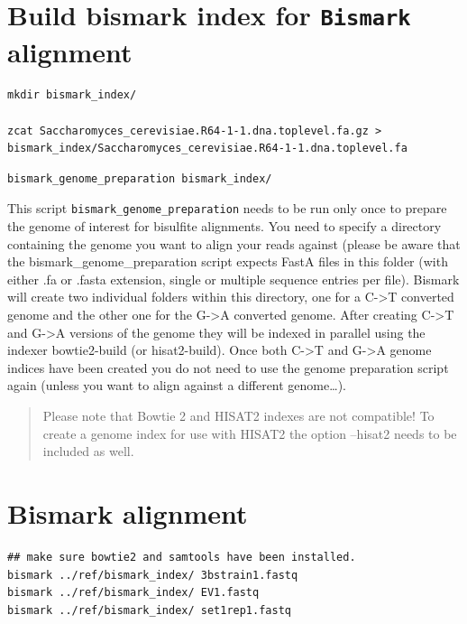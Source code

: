 \documentclass[]{book}
\begin{document}
\hypertarget{build-bismark-index-for-bismark-alignment}{%
\section{\texorpdfstring{Build bismark index for \texttt{Bismark} alignment}{Build bismark index for Bismark alignment}}\label{build-bismark-index-for-bismark-alignment}}

\begin{verbatim}
mkdir bismark_index/

zcat Saccharomyces_cerevisiae.R64-1-1.dna.toplevel.fa.gz > bismark_index/Saccharomyces_cerevisiae.R64-1-1.dna.toplevel.fa
\end{verbatim}

\begin{verbatim}
bismark_genome_preparation bismark_index/
\end{verbatim}

This script \texttt{bismark\_genome\_preparation} needs to be run only once to prepare the genome of interest for bisulfite alignments. You need to specify a directory containing the genome you want to align your reads against (please be aware that the bismark\_genome\_preparation script expects FastA files in this folder (with either .fa or .fasta extension, single or multiple sequence entries per file). Bismark will create two individual folders within this directory, one for a C-\textgreater{}T converted genome and the other one for the G-\textgreater{}A converted genome. After creating C-\textgreater{}T and G-\textgreater{}A versions of the genome they will be indexed in parallel using the indexer bowtie2-build (or hisat2-build). Once both C-\textgreater{}T and G-\textgreater{}A genome indices have been created you do not need to use the genome preparation script again (unless you want to align against a different genome\ldots{}).

\begin{quote}
Please note that Bowtie 2 and HISAT2 indexes are not compatible! To create a genome index for use with HISAT2 the option --hisat2 needs to be included as well.
\end{quote}

\hypertarget{bismark-alignment}{%
\section{Bismark alignment}\label{bismark-alignment}}

\begin{verbatim}
## make sure bowtie2 and samtools have been installed.
bismark ../ref/bismark_index/ 3bstrain1.fastq 
bismark ../ref/bismark_index/ EV1.fastq 
bismark ../ref/bismark_index/ set1rep1.fastq
\end{verbatim}
\end{document}
